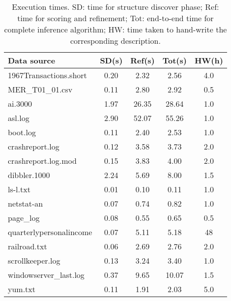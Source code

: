 
\begin{table}
\begin{center}
\begin{tabular}{|l||c|c|c|c|} \hline
Data source			& SD(s)     & Ref(s) 	& Tot(s)  & HW(h)\\ \hline \hline
1967Transactions.short          & 0.20&      2.32&      2.56 	& 4.0 	 \\ \hline
MER\_T01\_01.csv                & 0.11&      2.80&      2.92 	& 0.5 	 \\ \hline
ai.3000                         & 1.97&      26.35&     28.64	& 1.0 	 \\ \hline
asl.log                         & 2.90&      52.07&     55.26	& 1.0 	 \\ \hline
boot.log                        & 0.11&      2.40&      2.53 	& 1.0 	 \\ \hline
crashreport.log                 & 0.12&      3.58&      3.73 	& 2.0 	 \\ \hline
crashreport.log.mod             & 0.15&      3.83&      4.00 	& 2.0 	 \\ \hline
dibbler.1000                    & 2.24&      5.69&      8.00 	& 1.5 	 \\ \hline
ls-l.txt                        & 0.01&      0.10&      0.11 	& 1.0 	 \\ \hline
netstat-an                      & 0.07&      0.74&      0.82 	& 1.0 	 \\ \hline
page\_log                       & 0.08&      0.55&      0.65 	& 0.5 	 \\ \hline
quarterlypersonalincome         & 0.07&      5.11&      5.18 	& 48  	 \\ \hline
railroad.txt                    & 0.06&      2.69&      2.76 	& 2.0 	 \\ \hline
scrollkeeper.log                & 0.13&      3.24&      3.40 	& 1.0 	 \\ \hline
windowserver\_last.log          & 0.37&      9.65&      10.07	& 1.5 	 \\ \hline
yum.txt                         & 0.11&      1.91&      2.03 	& 5.0 	 \\ \hline
\end{tabular}
\caption{Execution times. SD: time for structure discover phase; Ref: time for scoring and 
refinement; Tot: end-to-end time for complete inference algorithm; HW: 
time taken to hand-write the corresponding description.}
\label{tab:times}
\end{center}
\end{table}

